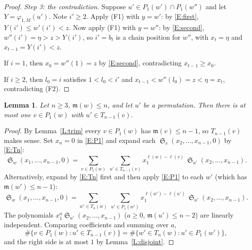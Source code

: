 \documentclass{amsart}
\newtheorem{lemma}{Lemma}[subsection]
\theoremstyle{definition}
\theoremstyle{remark}
\numberwithin{equation}{subsection}
\DeclareMathOperator{\sch}{\mathfrak{S}}
\newcommand{\maxd}{\mathfrak{m}}
\begin{document}
\begin{proof}
\emph{Step 3: the contradiction.}
Suppose $u'\in P_1(w')\cap P_1(w'')$ and let $Y=\varphi_{1,M}(u')$. Note $i'\ge2$.
Apply (F1) with $y=w'$: by \eqref{E:first}, $Y(i')\le w'(i')<z$.
Now apply (F1) with $y=w''$: by \eqref{E:second}, $w''(i')=\eta>z>Y(i')$, so $i'=b_t$ is a chain position for $w''$, with
$x_t=\eta$ and $x_{t-1}=Y(i')<z$.

If $i=1$, then $x_0=w''(1)=z$ by \eqref{E:second}, contradicting $x_{t-1}\ge x_0$.

If $i\ge2$, then $l_0=i$ satisfies $1<l_0<i'$ and $x_{t-1}<w''(l_0)=z<\eta=x_t$, contradicting (F2).
\end{proof}

\begin{lemma}\label{L:unique}
Let $n\ge 3$, $\maxd(w)\le n$, and let $u'$ be a permutation. Then there is at most one $v\in P_1(w)$ with $u'\in T_{n-1}(v)$.
\end{lemma}
\begin{proof}
By Lemma~\ref{L:trim} every $v\in P_1(w)$ has $\maxd(v)\le n-1$, so $T_{n-1}(v)$ makes sense.
Set $x_n=0$ in \eqref{E:P1} and expand each $\sch_v(x_2,\dots,x_{n-1},0)$ by \eqref{E:Tn}:
\[
\sch_w(x_1,\dots,x_{n-1},0)=\sum_{v\in P_1(w)}\ \sum_{u'\in T_{n-1}(v)}x_1^{\ell(w)-\ell(v)}\,\sch_{u'}(x_2,\dots,x_{n-1}).
\]
Alternatively, expand by \eqref{E:Tn} first and then apply \eqref{E:P1} to each $w'$ (which has $\maxd(w')\le n-1$):
\[
\sch_w(x_1,\dots,x_{n-1},0)=\sum_{w'\in T_n(w)}\ \sum_{u'\in P_1(w')}x_1^{\ell(w')-\ell(u')}\,\sch_{u'}(x_2,\dots,x_{n-1}).
\]
The polynomials $x_1^{a}\sch_{u'}(x_2,\dots,x_{n-1})$ ($a\ge0$, $\maxd(u')\le n-2$) are linearly independent. Comparing coefficients and summing over $a$,
\[
\#\{v\in P_1(w): u'\in T_{n-1}(v)\}=\#\{w'\in T_n(w): u'\in P_1(w')\},
\]
and the right side is at most $1$ by Lemma~\ref{L:disjoint}.
\end{proof}
\end{document}
